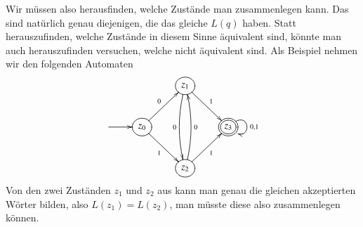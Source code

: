 Wir müssen also herausfinden, welche Zustände man zusammenlegen
kann.
Das sind natürlich genau diejenigen, die das gleiche $L(q)$
haben.
%
Statt herauszufinden, welche Zustände in diesem Sinne äquivalent
sind, könnte man auch herauszufinden versuchen, welche nicht äquivalent
sind.
Als Beispiel nehmen wir den folgenden Automaten
\[
\entrymodifiers={++[o][F]}
\xymatrix{
*+\txt{}
	&*+\txt{}
		&{z_1}\ar@/_/[dd]_{0} \ar[dr]^{1}
\\
*+\txt{} \ar[r]
	&{z_0}\ar[ur]^{0} \ar[dr]_1
		&*+\txt{}
			&*++[o][F=]{z_3}\ar@(ur,dr)^{0,1}
\\
*+\txt{}
	&*+\txt{}
		&{z_2} \ar@/_/[uu]_{0} \ar[ur]_{1}
}
\]
Von den zwei Zuständen $z_1$ und $z_2$ aus kann man genau die gleichen
akzeptierten Wörter bilden, also $L(z_1)=L(z_2)$, man müsste diese
also zusammenlegen können.

%
